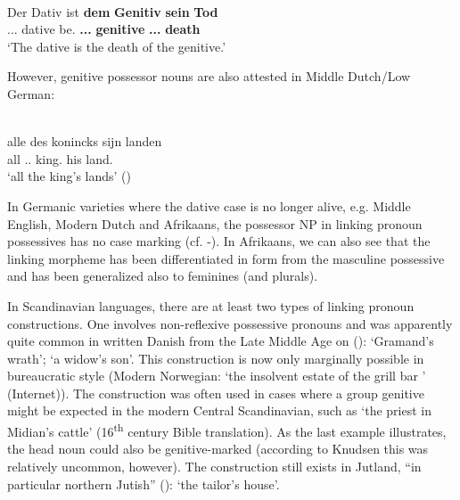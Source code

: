 \ea\label{}
\\
\gll Der  Dativ  ist  \textbf{dem} \textbf{Genitiv} \textbf{sein} \textbf{Tod}\\
{}.{\m}.{\sg}.{\nom}  dative  be.{\prs}  \textbf{{}.{\m}.{\sg}.{\dat}} \textbf{genitive} \textbf{{\poss}.{\m}.{\sg}.{\nom}} \textbf{death}\\
\glt  ‘The dative is the death of the genitive.’
\z

 However, genitive possessor nouns are also attested in Middle Dutch/Low German:

\ea\label{}
\\
\gll alle  des  konincks  sijn  landen\\
all  {}.{\m}.{\gen}  king.{\gen}  his  land.{\pl}\\
\glt ‘all the king’s lands’ (\citet[58]{Norde1997})
\z

In Germanic varieties where the dative case is no longer alive, e.g. Middle English, Modern Dutch and Afrikaans, the possessor NP in linking pronoun possessives has no case marking (cf. -). In Afrikaans, we can also see that the linking morpheme  has been differentiated in form from the masculine possessive  and has been generalized also to feminines (and plurals).

In Scandinavian languages, there are at least two types of linking pronoun constructions. One involves non-reflexive possessive pronouns and was apparently quite common in written Danish from the Late Middle Age on (\citet[61]{Knudsen1941}): ‘Gramand’s wrath’;  ‘a widow’s son’. This construction is now only marginally possible in bureaucratic style (Modern Norwegian:  ‘the insolvent estate of the grill bar ’ (Internet)). The construction was often used in cases where a group genitive might be expected in the modern Central Scandinavian, such as  ‘the priest in Midian’s cattle’ (16\textsuperscript{th} century Bible translation). As the last example illustrates, the head noun could also be genitive-marked (according to Knudsen this was relatively uncommon, however). The construction still exists in Jutland, “in particular northern Jutish” (\citet[62]{Knudsen1941}):  ‘the tailor’s house’.

